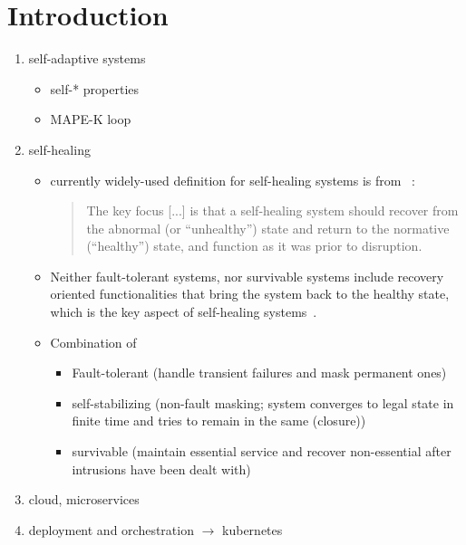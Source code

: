 
\section{Introduction}\label{sec:introduction}
  \begin{enumerate}
    \item self-adaptive systems
      \begin{itemize}
        \item self-* properties
        \item MAPE-K loop
      \end{itemize}

    \item self-healing
      \begin{itemize}
        \item currently widely-used definition for self-healing systems is from \citeauthor{Ghosh}~\cite{Ghosh}:
          \begin{quote}
            The key focus [...] is that a self-healing system should recover from the abnormal (or \enquote{unhealthy}) state and return to the normative (\enquote{healthy}) state, and function as it was prior to disruption.
          \end{quote}
        \item Neither fault-tolerant systems, nor survivable systems include recovery oriented functionalities that bring the system back to the healthy state, which is the key aspect of self-healing systems~\cite{Ghosh}.
        \item Combination of~\cite{PsaierSurvey}
          \begin{itemize}
            \item Fault-tolerant (handle transient failures and mask permanent ones)
            \item self-stabilizing (non-fault masking; system converges to legal state in finite time and tries to remain in the same (closure))
            \item survivable (maintain essential service and recover non-essential after intrusions have been dealt with)
          \end{itemize}
      \end{itemize}

    \item cloud, microservices

    \item deployment and orchestration $\rightarrow$ \gls{kubernetes}
  \end{enumerate}

